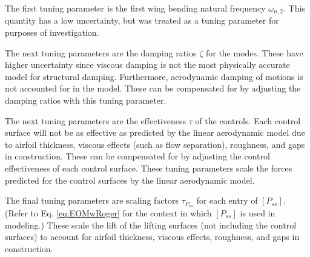 The first tuning parameter is the first wing bending natural frequency $\omega_{n,2}$. This quantity has a low uncertainty, but was treated as a tuning parameter for purposes of investigation.

The next tuning parameters are the damping ratios $\zeta$ for the modes. These have higher uncertainty since viscous damping is not the most physically accurate model for structural damping. Furthermore, aerodynamic damping of motions is not accounted for in the model. These can be compensated for by adjusting the damping ratios with this tuning parameter.

The next tuning parameters are the effectiveness $\tau$ of the controls. Each control surface will not be as effective as predicted by the linear aerodynamic model due to airfoil thickness, viscous effects (such as flow separation), roughness, and gaps in construction. These can be compensated for by adjusting the control effectiveness of each control surface. These tuning parameters scale the forces predicted for the control surfaces by the linear aerodynamic model.

The final tuning parameters are scaling factors $\tau_{P_{ss}}$ for each entry of $[P_{ss}]$. (Refer to Eq. \ref{eq:EOMwRoger} for the context in which $[P_{ss}]$ is used in modeling.) These scale the lift of the lifting surfaces (not including the control surfaces) to account for airfoil thickness, viscous effects, roughness, and gaps in construction.

